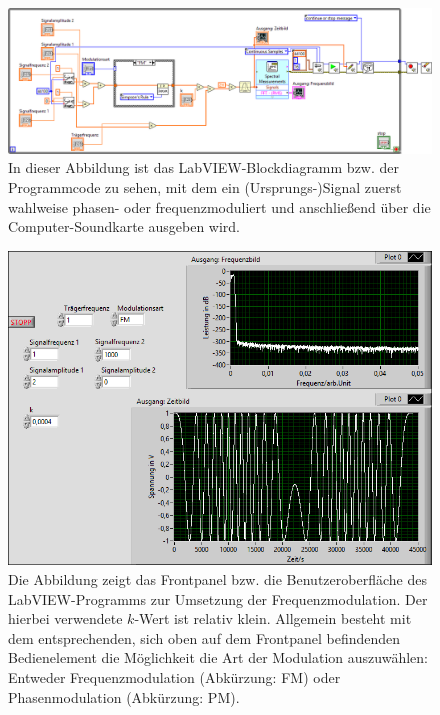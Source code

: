 \documentclass[
a4paper,
12pt,
pagesize,
ngerman
]{scrartcl}
\begin{document}
	\begin{figure}[H]
		\centering
		\includegraphics[width=1.0\textwidth]{EIRE2018Dateien/Tag4/FMPM-Erzeugung/FMPM-Erzeugungd}
		\caption{In dieser Abbildung ist das LabVIEW-Blockdiagramm bzw. der Programmcode zu sehen, mit dem ein (Ursprungs-)Signal zuerst wahlweise phasen- oder frequenzmoduliert und anschließend über die Computer-Soundkarte ausgeben wird.}
		\label{FMProgrammcode}
	\end{figure}

	\noindent

	\begin{figure}[H]
		\centering
		\includegraphics[width=1.0\textwidth]{EIRE2018Dateien/Tag4/FMPM-Erzeugung/FM-FMPM-Erzeugungp}
		\caption{Die Abbildung zeigt das Frontpanel bzw. die Benutzeroberfläche des LabVIEW-Programms zur Umsetzung der Frequenzmodulation. Der hierbei verwendete $k$-Wert ist relativ klein. Allgemein besteht mit dem entsprechenden, sich oben auf dem Frontpanel befindenden Bedienelement die Möglichkeit die Art der Modulation auszuwählen: Entweder Frequenzmodulation (Abkürzung: FM) oder Phasenmodulation (Abkürzung: PM).}
		\label{FMAusgabekleinesk}
	\end{figure}
	
\end{document}
